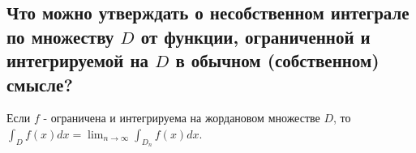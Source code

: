 
\subsection{Что можно утверждать о несобственном интеграле по множеству $D$ от функции, ограниченной и интегрируемой на $D$ в обычном (собственном) смысле?}
Если $f$ - ограничена и интегрируема на жордановом множестве $D$, то $\int_{D} f(x) dx = \lim_{n \to \infty} \int_{D_n} f(x) dx$.


